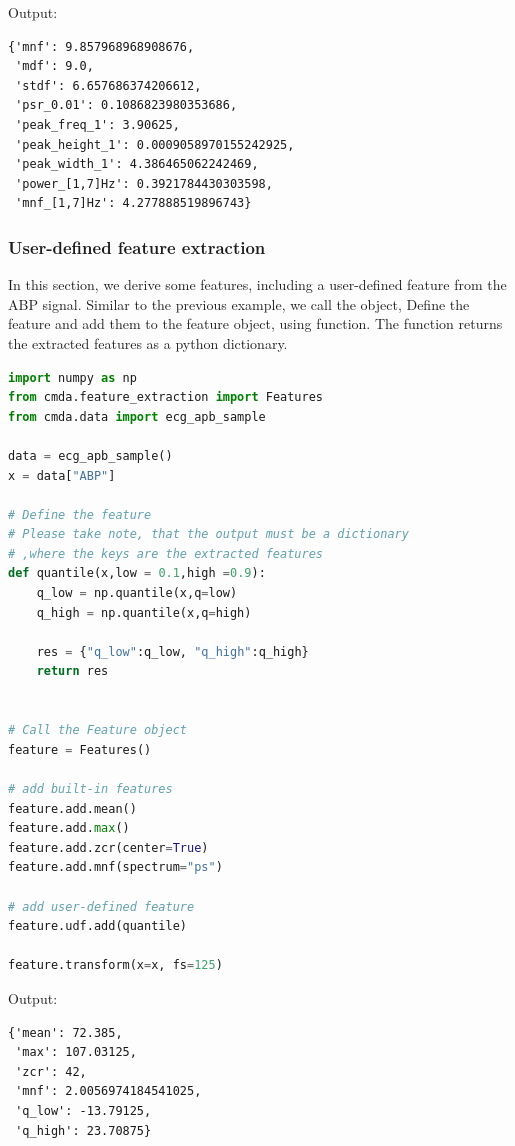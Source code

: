 \documentclass{article}
\begin{document}
Output:
\begin{lstlisting}[caption=Frequency-domain feature extraction output]
{'mnf': 9.857968968908676,
 'mdf': 9.0,
 'stdf': 6.657686374206612,
 'psr_0.01': 0.1086823980353686,
 'peak_freq_1': 3.90625,
 'peak_height_1': 0.0009058970155242925,
 'peak_width_1': 4.386465062242469,
 'power_[1,7]Hz': 0.3921784430303598,
 'mnf_[1,7]Hz': 4.277888519896743}
\end{lstlisting}

\subsubsection{User-defined feature extraction}
In this section, we derive some features, including a user-defined feature from the ABP signal. Similar to the previous example, we call the  object, Define the feature and add them to the feature object, using  function. The  function returns the extracted features as a python dictionary.

\begin{lstlisting}[language=Python, caption=User-defined feature extraction]
import numpy as np
from cmda.feature_extraction import Features
from cmda.data import ecg_apb_sample

data = ecg_apb_sample()
x = data["ABP"]

# Define the feature
# Please take note, that the output must be a dictionary
# ,where the keys are the extracted features
def quantile(x,low = 0.1,high =0.9):
    q_low = np.quantile(x,q=low)
    q_high = np.quantile(x,q=high)
    
    res = {"q_low":q_low, "q_high":q_high}
    return res


# Call the Feature object
feature = Features()

# add built-in features
feature.add.mean()
feature.add.max()
feature.add.zcr(center=True)
feature.add.mnf(spectrum="ps")

# add user-defined feature
feature.udf.add(quantile)

feature.transform(x=x, fs=125)
\end{lstlisting}

Output:
\begin{lstlisting}[caption=User-defined feature extraction output]
{'mean': 72.385,
 'max': 107.03125,
 'zcr': 42,
 'mnf': 2.0056974184541025,
 'q_low': -13.79125,
 'q_high': 23.70875}
\end{lstlisting}
\end{document}
